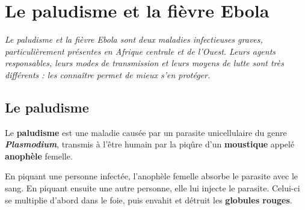 \chapter{Le paludisme et la fièvre Ebola}

\noindent\textit{Le paludisme et la fièvre Ebola sont deux maladies infectieuses graves,
particulièrement présentes en Afrique centrale et de l'Ouest. Leurs agents responsables,
leurs modes de transmission et leurs moyens de lutte sont très différents : les
connaître permet de mieux s'en protéger.}
\vspace{8pt}

\connecteBanner

\section{Le paludisme}

\begin{definition}[Paludisme]
Le \textbf{paludisme} est une maladie causée par un parasite unicellulaire du genre
\textbf{\textit{Plasmodium}}, transmis à l'être humain par la piqûre d'un
\textbf{moustique} appelé \textbf{anophèle} femelle.
\end{definition}

\begin{propriete}
En piquant une personne infectée, l'anophèle femelle absorbe le parasite avec le sang.
En piquant ensuite une autre personne, elle lui injecte le parasite. Celui-ci se
multiplie d'abord dans le foie, puis envahit et détruit les \textbf{globules
rouges}.
\end{propriete}

\begin{illus}
\end{illus}

